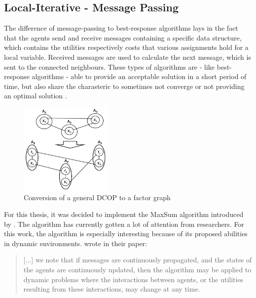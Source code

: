 \subsection{Local-Iterative - Message Passing}
The difference of message-passing to best-response algorithms lays in the fact that the agents send and receive messages containing a specific data structure, which contains the utilities respectively costs that various assignments hold for a local variable. Received messages are used to calculate the next message, which is sent to the connected neighbours. These types of algorithms are - like best-response algorithms - able to provide an acceptable solution in a short period of time, but also share the charasteric to sometimes not converge or not providing an optimal solution \cite{Chapman2011}.
\begin{figure}[H]
\centering
\includegraphics[width=170px]{graphics/factorgraph}
\caption{Conversion of a general DCOP to a factor graph \cite{Zivan2012}}
\label{fig:factorgraph}
\end{figure}

For this thesis, it was decided to implement the MaxSum algorithm introduced by \cite{Farinelli2008}. The algorithm has currently gotten a lot of attention from researchers. For this work, the algorithm is especially interesting because of its proposed abilities in dynamic environments.  \cite{Farinelli2008} wrote in their paper:
\begin{quote}
[...] we note that if messages are continuously propagated,
and the states of the agents are continuously updated, then the algorithm may be applied to dynamic problems where the interactions between agents, or the utilities resulting from these interactions, may change at any time.
\end{quote}

